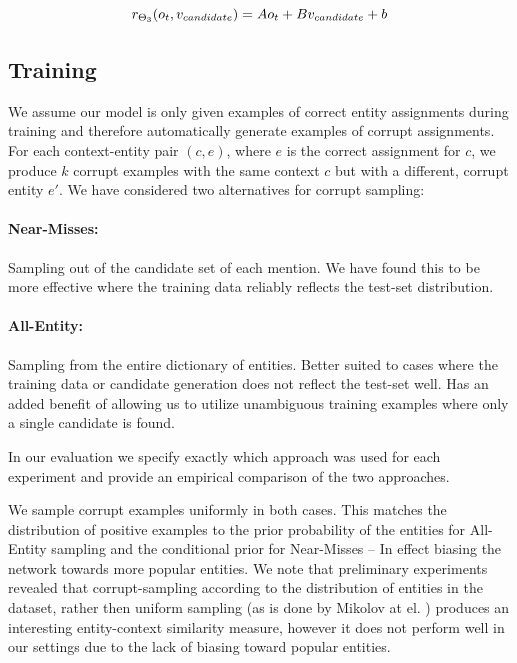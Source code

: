 \documentclass[11pt]{article}
\begin{document}
\begin{equation}
\label{eq3}
r_{\Theta_3}(o_t, v_{candidate}) = Ao_t + Bv_{candidate} + b \\
\end{equation}

\subsection{Training}

We assume our model is only given examples of correct entity assignments during training and therefore automatically generate examples of corrupt assignments. For each context-entity pair $(c,e)$, where $e$ is the correct assignment for $c$, we produce $k$ corrupt examples with the same context $c$ but with a different, corrupt entity $e'$. We have considered two alternatives for corrupt sampling:

\paragraph{Near-Misses:} 
Sampling out of the candidate set of each mention. We have found this to be more effective where the training data reliably reflects the test-set distribution.

\paragraph{All-Entity:} 
Sampling from the entire dictionary of entities. Better suited to cases where the training data or candidate generation does not reflect the test-set well. Has an added benefit of allowing us to utilize unambiguous training examples where only a single candidate is found.

In our evaluation we specify exactly which approach was used for each experiment and provide an empirical comparison of the two approaches.

We sample corrupt examples uniformly in both cases. This matches the distribution of positive examples to the prior probability of the entities for All-Entity sampling and the conditional prior for Near-Misses -- In effect biasing the network towards more popular entities. We note that preliminary experiments revealed that corrupt-sampling according to the distribution of entities in the dataset, rather then uniform sampling (as is done by Mikolov at el. ) produces an interesting entity-context similarity measure, however it does not perform well in our settings due to the lack of biasing toward popular entities.
\end{document}
